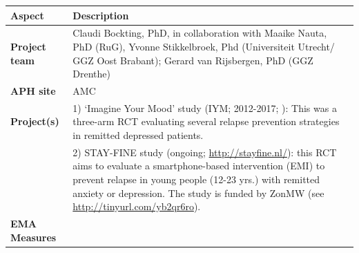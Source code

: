 \documentclass[]{book}
\begin{document}
\begin{longtable}[]{@{}ll@{}}
\toprule
\begin{minipage}[b]{0.25\columnwidth}\raggedright\strut
\textbf{Aspect}\strut
\end{minipage} & \begin{minipage}[b]{0.69\columnwidth}\raggedright\strut
\textbf{Description}\strut
\end{minipage}\tabularnewline
\midrule
\endhead
\begin{minipage}[t]{0.25\columnwidth}\raggedright\strut
\textbf{Project team}\strut
\end{minipage} & \begin{minipage}[t]{0.69\columnwidth}\raggedright\strut
Claudi Bockting, PhD, in collaboration with Maaike Nauta, PhD (RuG),
Yvonne Stikkelbroek, Phd (Universiteit Utrecht/ GGZ Oost Brabant);
Gerard van Rijsbergen, PhD (GGZ Drenthe)\strut
\end{minipage}\tabularnewline
\begin{minipage}[t]{0.25\columnwidth}\raggedright\strut
\textbf{APH site}\strut
\end{minipage} & \begin{minipage}[t]{0.69\columnwidth}\raggedright\strut
AMC\strut
\end{minipage}\tabularnewline
\begin{minipage}[t]{0.25\columnwidth}\raggedright\strut
\textbf{Project(s)}\strut
\end{minipage} & \begin{minipage}[t]{0.69\columnwidth}\raggedright\strut
1) `Imagine Your Mood' study (IYM; 2012-2017; \citet{Slofstra2017}):
This was a three-arm RCT evaluating several relapse prevention
strategies in remitted depressed patients.\strut
\end{minipage}\tabularnewline
\begin{minipage}[t]{0.25\columnwidth}\raggedright\strut
\strut
\end{minipage} & \begin{minipage}[t]{0.69\columnwidth}\raggedright\strut
2) STAY-FINE study (ongoing; \url{http://stayfine.nl/}): this RCT aims
to evaluate a smartphone-based intervention (EMI) to prevent relapse in
young people (12-23 yrs.) with remitted anxiety or depression. The study
is funded by ZonMW (see \url{http://tinyurl.com/yb2qr6ro}).\strut
\end{minipage}\tabularnewline
\begin{minipage}[t]{0.25\columnwidth}\raggedright\strut
\textbf{EMA Measures}\strut

\end{minipage}
\end{longtable}
\end{document}
